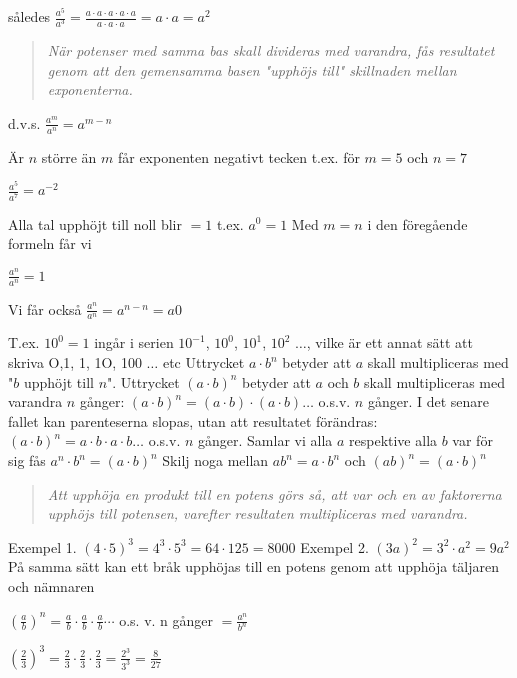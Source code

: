 således $\frac{a^5}{a^3}=\frac{a \cdot a \cdot a \cdot a \cdot a}{a \cdot a \cdot a} = a \cdot a = a^2$

\begin{quote}\emph{När potenser med samma bas skall divideras med varandra, fås
resultatet genom att den gemensamma basen "upphöjs till" skillnaden mellan
exponenterna.}\end{quote}

d.v.s. $\frac{a^m}{a^n} = a^{m-n}$

Är $n$ större än $m$ får exponenten negativt tecken t.ex. för $m = 5$ och $n = 7$

$\frac{a^5}{a^7} = a^{-2}$

Alla tal upphöjt till noll blir $= 1$ t.ex. $a^0 = 1$
Med $m = n$ i den föregående formeln får vi

$\frac{a^n}{a^n} = 1$

Vi får också $\frac{a^n}{a^n} = a^{n-n} =a0$

T.ex. $10^0 = 1$ ingår i serien $10^{-1}$, $10^0$, $10^1$, $10^2$ $\ldots$, vilke
är ett annat sätt att skriva O,1, 1, 1O, 100 $\ldots$ etc
Uttrycket $a \cdot b^n$ betyder att $a$ skall multipliceras med "$b$ upphöjt
till $n$".
Uttrycket $(a \cdot b)^n$ betyder att $a$ och $b$ skall multipliceras med
varandra $n$ gånger:
$(a \cdot b)^n = (a \cdot b) \cdot (a \cdot b) \ldots $ o.s.v. $n$ gånger.
I det senare fallet kan parenteserna slopas, utan att resultatet förändras:
$(a \cdot b)^n = a \cdot b \cdot a \cdot b \ldots$ o.s.v. $n$ gånger.
Samlar vi alla $a$ respektive alla $b$ var för sig fås $a^n \cdot b^n = (a \cdot b)^n$
Skilj noga mellan $ab^n = a \cdot b^n$
och $(ab)^n = (a \cdot b)^n$

\begin{quote}\emph{
Att upphöja en produkt till en potens görs så, att var och en av faktorerna
upphöjs till potensen, varefter resultaten multipliceras med varandra.
}\end{quote}

Exempel 1. $(4 \cdot 5)^3 = 4^3 \cdot 5^3 = 64 \cdot 125 = 8000$
Exempel 2. $(3a)^2 = 3^2 \cdot a^2 = 9a^2$
På samma sätt kan ett bråk upphöjas till en potens genom att upphöja täljaren
och nämnaren

$\left(\frac{a}{b}\right)^n = \frac{a}{b} \cdot \frac{a}{b} \cdot \frac{a}{b} \cdots$ o.s. v. n gånger $= \frac{a^n}{b^n}$

$\left(\frac{2}{3}\right)^3 = \frac{2}{3} \cdot \frac{2}{3} \cdot \frac{2}{3} =  \frac{2^3}{3^3} = \frac{8}{27}$

